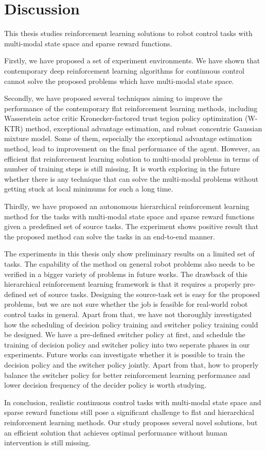 \chapter{Discussion}
This thesis studies reinforcement learning solutions to robot control tasks with multi-modal state space and sparse reward functions.

Firstly, we have proposed a set of experiment environments. We have shown that contemporary deep reinforcement learning algorithms for continuous control cannot solve the proposed problems which have multi-modal state space. 

Secondly, we have proposed several techniques aiming to improve the performance of the contemporary flat reinforcement learning methods, including Wasserstein actor critic Kronecker-factored trust tegion policy optimization (W-KTR) method, exceptional advantage estimation, and robust concentric Gaussian mixture model. Some of them, especially the exceptional advantage estimation method, lead to improvement on the final performance of the agent. However, an efficient flat reinforcement learning solution to multi-modal problems in terms of number of training steps is still missing. It is worth exploring in the future whether there is any technique that can solve the multi-modal problems without getting stuck at local minimums for such a long time.

Thirdly, we have proposed an autonomous hierarchical reinforcement learning method for the tasks with multi-modal state space and sparse reward functions given a predefined set of source tasks. The experiment shows positive result that the proposed method can solve the tasks in an end-to-end manner.

The experiments in this thesis only show preliminary results on a limited set of tasks. The capability of the method on general robot problems also needs to be verified in a bigger variety of problems in future works. The drawback of this hierarchical reinforcement learning framework is that it requires a properly pre-defined set of source tasks. Designing the source-task set is easy for the proposed problems, but we are not sure whether the job is feasible for real-world robot control tasks in general. Apart from that, we have not thoroughly investigated how the scheduling of decision policy training and switcher policy training could be designed. We have a pre-defined switcher policy at first, and schedule the training of decision policy and switcher policy into two seperate phases in our experiments. Future works can investigate whether it is possible to train the decision policy and the switcher policy jointly. Apart from that, how to properly balance the switcher policy for better reinforcement learning performance and lower decision frequency of the decider policy is worth studying.

In conclusion, realistic continuous control tasks with multi-modal state space and sparse reward functions still pose a significant challenge to flat and hierarchical reinforcement learning methods. Our study proposes several novel solutions, but an efficient solution that achieves optimal performance without human intervention is still missing.